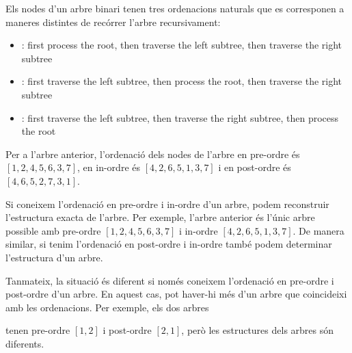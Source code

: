 Els nodes d'un arbre binari tenen tres ordenacions naturals que es
corresponen a maneres distintes de recórrer l'arbre recursivament:


\begin{itemize}
\item {}: first process the root,
then traverse the left subtree, then traverse the right subtree
\item {}: first traverse the left subtree,
then process the root, then traverse the right subtree
\item {}: first traverse the left subtree,
then traverse the right subtree, then process the root
\end{itemize}


Per a l'arbre anterior, l'ordenació dels nodes de l'arbre en pre-ordre
és $[1,2,4,5,6,3,7]$, en in-ordre és $[4,2,6,5,1,3,7] $ i en
post-ordre és $[4,6,5,2,7,3,1]$.

Si coneixem l'ordenació en pre-ordre i in-ordre d'un arbre, podem
reconstruir l'estructura exacta de l'arbre. Per exemple, l'arbre
anterior és l'únic arbre possible amb pre-ordre $[1,2,4,5,6,3,7]$ i
in-ordre $[4,2,6,5,1,3, 7]$. De manera similar, si tenim l'ordenació
en post-ordre i in-ordre també podem determinar l'estructura d'un
arbre.

Tanmateix, la situació és diferent si només coneixem l'ordenació en
pre-ordre i post-ordre d'un arbre. En aquest cas, pot haver-hi més
d'un arbre que coincideixi amb les ordenacions. Per exemple, els dos
arbres
\begin{center}
\end{center}
tenen pre-ordre $[1,2]$ i post-ordre $[2,1]$, però les estructures
dels arbres són diferents.

